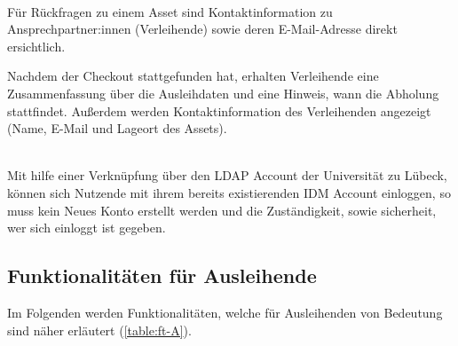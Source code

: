     {\sffamily\color{maincolor}{Ft-VA-3 | Sichtbarkeit von
            Ansprechpartner:innen}}\\
Für Rückfragen zu einem Asset sind Kontaktinformation zu Ansprechpartner:innen
(Verleihende) sowie deren E-Mail-Adresse direkt ersichtlich.

Nachdem der Checkout stattgefunden hat, erhalten Verleihende eine
Zusammenfassung über die Ausleihdaten und eine  Hinweis, wann die Abholung
stattfindet. Außerdem werden Kontaktinformation des Verleihenden angezeigt
(Name, E-Mail und Lageort des Assets).


    {\sffamily\color{maincolor}{Ft-VA-4 | Authentifizierung per IDM Account}}\\
Mit hilfe einer Verknüpfung über den LDAP Account der Universität zu Lübeck,
können sich Nutzende mit ihrem bereits existierenden IDM Account einloggen, so
muss kein Neues Konto erstellt werden und die Zuständigkeit, sowie sicherheit,
wer sich einloggt ist gegeben.

\subsection{Funktionalitäten für Ausleihende}
Im Folgenden werden Funktionalitäten, welche für Ausleihenden von Bedeutung sind
näher erläutert (\ref{table:ft-A}).


